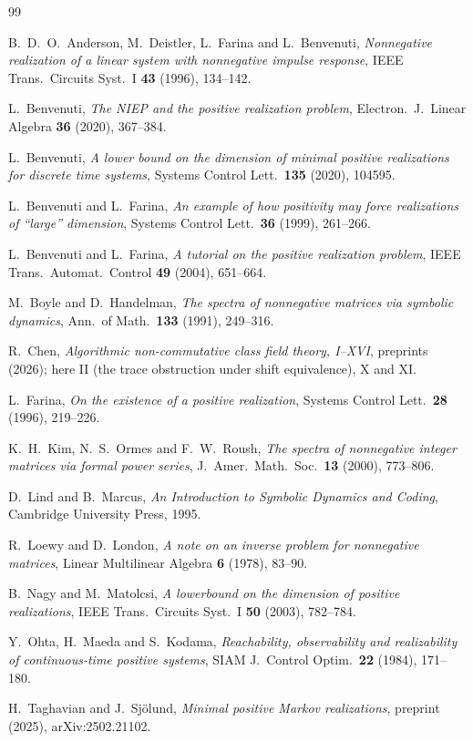 \documentclass[11pt]{article}
\theoremstyle{plain}
\theoremstyle{remark}
\begin{document}
\begin{thebibliography}{99}

 B.~D.~O.~Anderson, M.~Deistler, L.~Farina and L.~Benvenuti,
\emph{Nonnegative realization of a linear system with nonnegative impulse response},
IEEE Trans.\ Circuits Syst.\ I \textbf{43} (1996), 134--142.

 L.~Benvenuti,
\emph{The NIEP and the positive realization problem},
Electron.\ J.\ Linear Algebra \textbf{36} (2020), 367--384.

 L.~Benvenuti,
\emph{A lower bound on the dimension of minimal positive realizations for discrete time
systems}, Systems Control Lett.\ \textbf{135} (2020), 104595.

 L.~Benvenuti and L.~Farina,
\emph{An example of how positivity may force realizations of ``large'' dimension},
Systems Control Lett.\ \textbf{36} (1999), 261--266.

 L.~Benvenuti and L.~Farina,
\emph{A tutorial on the positive realization problem},
IEEE Trans.\ Automat.\ Control \textbf{49} (2004), 651--664.

 M.~Boyle and D.~Handelman,
\emph{The spectra of nonnegative matrices via symbolic dynamics},
Ann.\ of Math.\ \textbf{133} (1991), 249--316.

 R.~Chen,
\emph{Algorithmic non-commutative class field theory, I--XVI}, preprints (2026);
here II (the trace obstruction under shift equivalence), X and XI.

 L.~Farina,
\emph{On the existence of a positive realization},
Systems Control Lett.\ \textbf{28} (1996), 219--226.

 K.~H.~Kim, N.~S.~Ormes and F.~W.~Roush,
\emph{The spectra of nonnegative integer matrices via formal power series},
J.\ Amer.\ Math.\ Soc.\ \textbf{13} (2000), 773--806.

 D.~Lind and B.~Marcus,
\emph{An Introduction to Symbolic Dynamics and Coding},
Cambridge University Press, 1995.

 R.~Loewy and D.~London,
\emph{A note on an inverse problem for nonnegative matrices},
Linear Multilinear Algebra \textbf{6} (1978), 83--90.

 B.~Nagy and M.~Matolcsi,
\emph{A lowerbound on the dimension of positive realizations},
IEEE Trans.\ Circuits Syst.\ I \textbf{50} (2003), 782--784.

 Y.~Ohta, H.~Maeda and S.~Kodama,
\emph{Reachability, observability and realizability of continuous-time positive systems},
SIAM J.\ Control Optim.\ \textbf{22} (1984), 171--180.

 H.~Taghavian and J.~Sj\"olund,
\emph{Minimal positive Markov realizations},
preprint (2025), arXiv:2502.21102.

\end{thebibliography}
\end{document}
